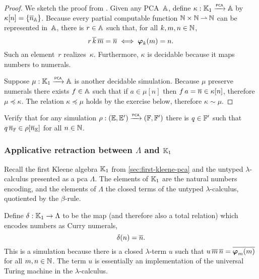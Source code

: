 \begin{proof}
  We sketch the proof from \cite[Theorem 2.4.18]{Longley:94}. Given any PCA~$\AA$, define $\kappa : \klone \pcato \AA$ by $\kappa[n] = \set{\numeral{n}_{\AA}}$. Because every partial computable function $\NN \times \NN \parto \NN$ can be represented in~$\AA$, there is $r \in \AA$ such that, for all $k, m, n \in \NN$,
  \begin{equation*}
    r \, \numeral{k} \, \numeral{m} = \numeral{n} \iff \pr{k}{m} = n.
  \end{equation*}
  Such an element~$r$ realizes~$\kappa$. Furthermore, $\kappa$ is decidable because it maps numbers to numerals.

  Suppose $\mu : \klone \pcato \AA$ is another decidable simulation. Because $\mu$ preserve numerals there exists $f \in \AA$ such that if $a \in \mu[n]$ then $f \, a = \numeral{n} \in \kappa[n]$, therefore $\mu \preceq \kappa$. The relation $\kappa \preceq \mu$ holds by the exercise below, therefore $\kappa \sim \mu$.
\end{proof}

\begin{exercise}
  Verify that for any simulation $\rho : (\EE, \subEE) \pcato (\FF, \subFF)$ there is $q \in \subFF$ such that $q \, \overline{n}_{\FF} \in \rho[\overline{n}_{\EE}]$ for all $n \in \NN$.
\end{exercise}

\subsubsection{Applicative retraction between $\Lambda$ and $\klone$}
\label{ex:pcamorphism-K1-lambda}%

Recall the first Kleene algebra $\klone$ from \cref{sec:first-kleene-pca} and the untyped $\lambda$-calculus presented as a pca $\Lambda$. The elements of $\klone$ are the natural numbers encoding, and the elements of $\Lambda$ the closed terms of the untyped $\lambda$-calculus, quotiented by the $\beta$-rule.

Define $\delta : \klone \to \Lambda$ to be the map (and therefore also a total relation) which encodes numbers as Curry numerals,
%
\begin{equation*}
  \delta(n) = \numeral{n}.
\end{equation*}
%
This is a simulation because there is a closed $\lambda$-term $u$ such that $u \, \overline{m} \, \overline{n} = \overline{\pr{m}{m}}$ for all $m, n \in \NN$. The term $u$ is essentially an implementation of the universal Turing machine in the $\lambda$-calculus.

